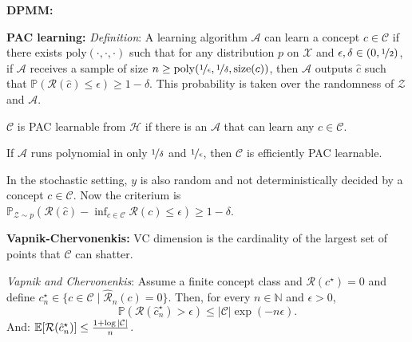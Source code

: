 \documentclass[9pt]{extarticle}
\newenvironment{topic}[1]
{\textbf{\sffamily \colorbox{black}{\rlap{\textbf{\textcolor{white}{#1}}}\hspace{\linewidth}\hspace{-2\fboxsep}}}}
{}
\newenvironment{subtopic}[1]
{\textbf{\sffamily #1:}}
{}
\begin{document}
\begin{multicols*}{3}
\begin{topic}{Non-parametric Bayesian methods}
\begin{subtopic}{DPMM}
        \end{subtopic}

    \end{topic}

    \begin{topic}{Statistical learning theory}

        \begin{subtopic}{PAC learning}
            \textit{Definition}: A learning algorithm $\mathcal{A}$ can learn a concept $c \in
                \mathcal{C}$ if there exists $\mathrm{poly}(\cdot, \cdot, \cdot)$ such that for any
            distribution $p$ on $\mathcal{X}$ and $\epsilon,\delta \in (0,\nicefrac{1}{2})$, if
            $\mathcal{A}$ receives a sample of size $n \geq \mathrm{poly}(\nicefrac{1}{\epsilon},
                \nicefrac{1}{\delta}, \mathrm{size}(c))$, then $\mathcal{A}$ outputs $\hat{c}$ such
            that $\mathbb{P}(\mathcal{R}(\hat{c}) \leq \epsilon) \geq 1-\delta$.
            This probability is taken over the randomness of $\mathcal{Z}$ and $\mathcal{A}$.

            $\mathcal{C}$ is PAC learnable from $\mathcal{H}$ if there is an $\mathcal{A}$ that can learn any $c \in \mathcal{C}$.

            If $\mathcal{A}$ runs polynomial in only $\nicefrac{1}{\delta}$ and $\nicefrac{1}{\epsilon}$, then
            $\mathcal{C}$ is efficiently PAC learnable.

            In the stochastic setting, $y$ is also random and not deterministically decided by a concept $c \in
                \mathcal{C}$. Now the criterium is $\mathbb{P}_{\mathcal{Z} \sim p}(\mathcal{R}(\hat{c}) - \inf_{c
                    \in \mathcal{C}} \mathcal{R}(c) \leq \epsilon) \geq 1-\delta$.

        \end{subtopic}

        \begin{subtopic}{Vapnik-Chervonenkis}
            VC dimension is the cardinality of the largest set of points that $\mathcal{C}$ can shatter.

            \textit{Vapnik and Chervonenkis}: Assume a finite concept class and $\mathcal{R}(c^\star) = 0$ and define
            $c_n^\star \in \{ c \in \mathcal{C} \mid \hat{\mathcal{R}}_n(c) = 0 \}$. Then, for every $n \in
                \mathbb{N}$ and $\epsilon > 0$, \[
                \mathbb{P}(\mathcal{R}(\hat{c}^\star_n) > \epsilon) \leq |\mathcal{C}| \exp(-n \epsilon).
            \]
            And: $\mathbb{E}[\mathcal{R}(\hat{c}_n^\star)] \leq \frac{1 + \log |\mathcal{C}|}{n}$.


\end{subtopic}
\end{topic}
\end{multicols*}
\end{document}
